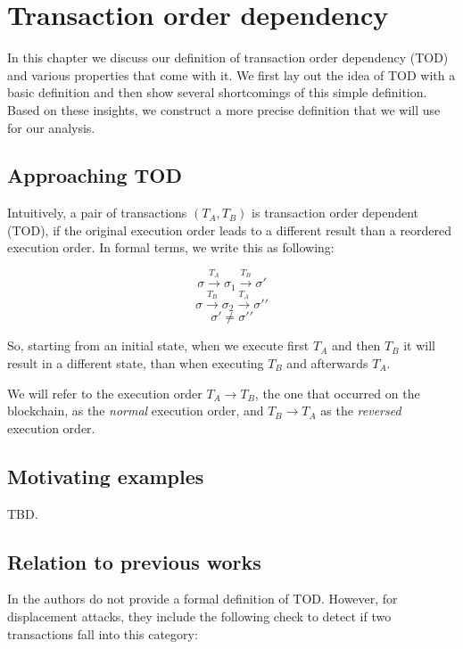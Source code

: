 \documentclass[draft,final]{vutinfth} %
\begin{document}
\chapter{Transaction order dependency}

In this chapter we discuss our definition of transaction order dependency (TOD) and various properties that come with it. We first lay out the idea of TOD with a basic definition and then show several shortcomings of this simple definition. Based on these insights, we construct a more precise definition that we will use for our analysis.

\section{Approaching TOD}

Intuitively, a pair of transactions $(T_A, T_B)$ is transaction order dependent (TOD), if the original execution order leads to a different result than a reordered execution order. In formal terms, we write this as following:

$$\sigma \xrightarrow{T_A} \sigma_1 \xrightarrow{T_B} \sigma \prime$$
$$\sigma \xrightarrow{T_B} \sigma_2 \xrightarrow{T_A} \sigma \prime \prime$$
$$\sigma \prime \neq \sigma \prime \prime$$

So, starting from an initial state, when we execute first $T_A$ and then $T_B$ it will result in a different state, than when executing $T_B$ and afterwards $T_A$.

We will refer to the execution order $T_A \rightarrow T_B$, the one that occurred on the blockchain, as the \emph{normal} execution order, and $T_B \rightarrow T_A$ as the \emph{reversed} execution order.

\section{Motivating examples}

TBD.

\section{Relation to previous works}

In \cite{torres_frontrunner_2021} the authors do not provide a formal definition of TOD. However, for displacement attacks, they include the following check to detect if two transactions fall into this category:
\end{document}
